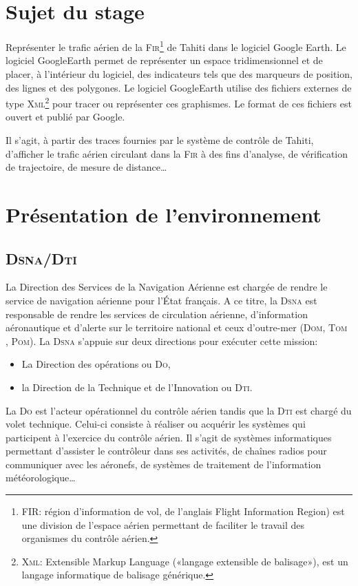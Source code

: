 \section{Sujet du stage}
Représenter le trafic aérien de la \textsc{Fir}\footnote{FIR: région d'information de vol, de l'anglais Flight Information Region) est une division de l'espace aérien permettant de faciliter le travail des organismes du contrôle aérien.} de Tahiti dans le logiciel Google Earth. Le logiciel GoogleEarth permet de représenter un espace tridimensionnel et de placer, à l’intérieur du logiciel, des indicateurs tels que des marqueurs de position, des lignes et des polygones. Le logiciel GoogleEarth utilise des fichiers externes de type \textsc{Xml}\footnote{\textsc{Xml}: Extensible Markup Language («langage extensible de balisage»), est un langage informatique de balisage générique.} pour tracer ou représenter ces graphismes. Le format de ces fichiers est ouvert et publié par Google. 

Il s’agit, à partir des traces fournies par le système de contrôle de Tahiti, d’afficher le trafic aérien circulant dans la \textsc{Fir} à des fins d’analyse, de vérification de trajectoire, de mesure de distance…

    
\section{Présentation de l’environnement}
    \subsection{\textsc{Dsna/Dti}}
La Direction des Services de la Navigation Aérienne est chargée de rendre le service de navigation aérienne pour l’État français. A ce titre, la \textsc{Dsna} est responsable de rendre les services de circulation aérienne, d’information aéronautique et d’alerte sur le territoire national et ceux d’outre-mer (\textsc{Dom, Tom , Pom}). La \textsc{Dsna} s’appuie sur deux directions pour exécuter cette mission:
\begin{itemize}
    \item La Direction des opérations ou \textsc{Do},
    \item la Direction de la Technique et de l’Innovation ou \textsc{Dti}.
\end{itemize}\medskip
La \textsc{Do} est l’acteur opérationnel du contrôle aérien tandis que la \textsc{Dti} est chargé du volet technique. Celui-ci consiste à réaliser ou acquérir les systèmes qui participent à l’exercice du contrôle aérien. Il s’agit de systèmes informatiques permettant d’assister le contrôleur dans ses activités, de chaînes radios pour communiquer avec les aéronefs, de systèmes de traitement de l’information météorologique…

